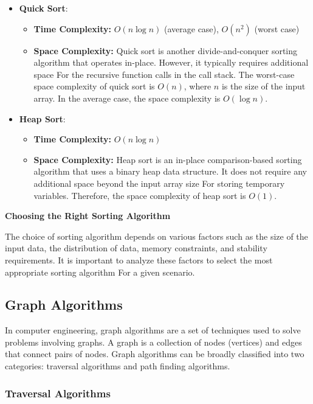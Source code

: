 \documentclass[12pt]{book} %
\begin{document}
\begin{itemize}
    
    \item \textbf{Quick Sort}: 
    \begin{itemize}
        \item \textbf{Time Complexity: }$O(n \log n)$ (average case), $O(n^2)$ (worst case)
        \item \textbf{Space Complexity: }Quick sort is another divide-and-conquer sorting algorithm that operates in-place. However, it typically requires additional space For the recursive function calls in the call stack. The worst-case space complexity of quick sort is \(O(n)\), where \(n\) is the size of the input array. In the average case, the space complexity is \(O(\log n)\).
        \end{itemize}
    \item \textbf{Heap Sort}:
    \begin{itemize}
        \item \textbf{Time Complexity: }$O(n \log n)$
        \item \textbf{Space Complexity: }Heap sort is an in-place comparison-based sorting algorithm that uses a binary heap data structure. It does not require any additional space beyond the input array size For storing temporary variables. Therefore, the space complexity of heap sort is \(O(1)\).
        \end{itemize}
\end{itemize}
\FloatBarrier
\textbf{Choosing the Right Sorting Algorithm}

The choice of sorting algorithm depends on various factors such as the size of the input data, the distribution of data, memory constraints, and stability requirements. It is important to analyze these factors to select the most appropriate sorting algorithm For a given scenario.



\subsection{Graph Algorithms}
In computer engineering, graph algorithms are a set of techniques used to solve problems involving graphs. A graph is a collection of nodes (vertices) and edges that connect pairs of nodes. Graph algorithms can be broadly classified into two categories: traversal algorithms and path finding algorithms.

\subsubsection{Traversal Algorithms}
\end{document}
